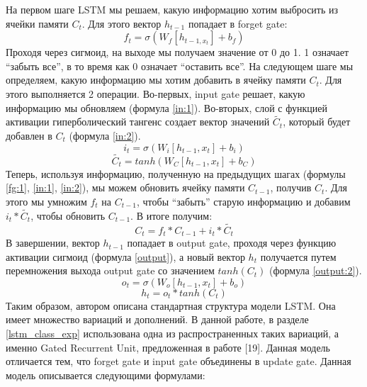     На первом шаге LSTM мы решаем, какую информацию хотим выбросить из ячейки памяти $C_{t}$. Для этого вектор $h_{t-1}$ попадает в forget gate:
    \begin{equation}\label{fg:1}
    f_{t} = \sigma(W_{f}[h_{t-1,x_{t}}]+b_{f})
    \end{equation}
    Проходя через сигмоид, на выходе мы получаем значение от 0 до 1. 1 означает ``забыть все'', в то время как 0 означает ``оставить все''.
    На следующем шаге мы определяем, какую информацию мы хотим добавить в ячейку памяти $C_{t}$. Для этого выполняется 2 операции. Во-первых, input gate решает, какую информацию мы обновляем (формула \ref{in:1}). Во-вторых, слой с функцией активации гиперболический тангенс создает вектор значений $\tilde{C_{t}}$, который будет добавлен в $C_{t}$ (формула \ref{in:2}).
    \begin{equation}\label{in:1}
    i_{t}=\sigma(W_{i}[h_{t-1},x_{t}]+b_{i})
    \end{equation}
    \begin{equation}\label{in:2}
    \tilde{C_{t}} = tanh(W_{C}[h_{t-1},x_{t}]+b_{C})
    \end{equation}
    Теперь, используя информацию, полученную на предыдущих шагах (формулы \ref{fg:1}, \ref{in:1}, \ref{in:2}), мы можем обновить ячейку памяти $C_{t-1}$, получив $C_{t}$. Для этого мы умножим $f_{t}$ на $C_{t-1}$, чтобы ``забыть'' старую информацию и добавим $i_{t}*\tilde{C_{t}}$, чтобы обновить $C_{t-1}$. В итоге получим:
    \begin{equation}\label{update}
    C_{t}=f_{t}*C_{t-1}+i_{t}*\tilde{C_{t}}
    \end{equation}
    В завершении, вектор $h_{t-1}$ попадает в output gate, проходя через функцию активации сигмоид (формула \ref{output}), а новый вектор $h_{t}$ получается путем перемножения выхода output gate со значением $tanh(C_{t})$ (формула \ref{output:2}).
    \begin{equation}\label{output}
    o_{t}=\sigma(W_{o}[h_{t-1},x_{t}]+b_{o})
    \end{equation}
    \begin{equation}\label{output:2}
    h_{t}=o_{t}*tanh(C_{t})
    \end{equation}
    Таким образом, автором описана стандартная структура модели LSTM. Она имеет множество вариаций и дополнений. В данной работе, в разделе \ref{lstm_class_exp} использована одна из распространенных таких вариаций, а именно Gated Recurrent Unit, предложенная в работе [19]. Данная модель отличается тем, что forget gate и input gate объединены в update gate. Данная модель описывается следующими формулами:
